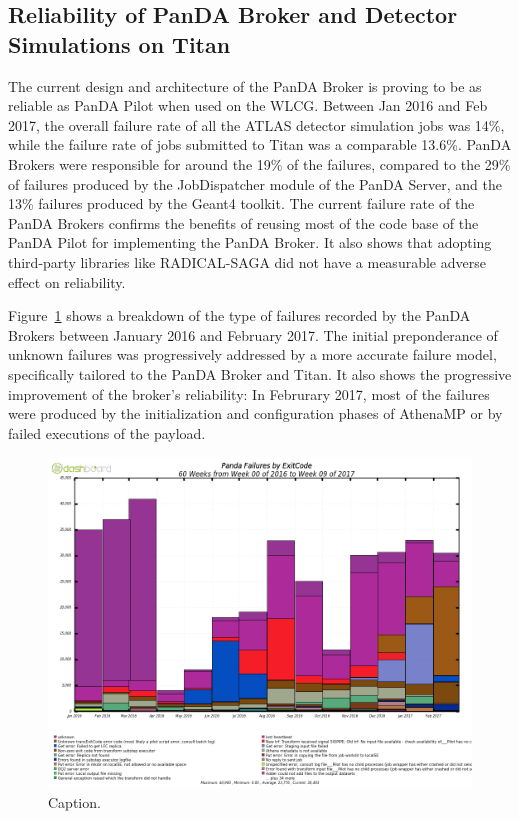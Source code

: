 \subsection{Reliability of PanDA Broker and Detector Simulations on Titan}
\label{ssec:reliability}

The current design and architecture of the PanDA Broker is proving to be as
reliable as PanDA Pilot when used on the WLCG. Between Jan 2016 and Feb 2017,
the overall failure rate of all the ATLAS detector simulation jobs was 14\%,
while the failure rate of jobs submitted to Titan was a comparable 13.6\%. PanDA
Brokers were responsible for around the 19\% of the failures, compared to the
29\% of failures produced by the JobDispatcher module of the PanDA Server, and
the 13\% failures produced by the Geant4 toolkit. The current failure rate of
the PanDA Brokers confirms the benefits of reusing most of the code base of the
PanDA Pilot for implementing the PanDA Broker. It also shows that adopting
third-party libraries like RADICAL-SAGA did not have a measurable adverse effect
on reliability.

Figure~\ref{fig:failures-titan} shows a breakdown of the type of failures
recorded by the PanDA Brokers between January 2016 and February 2017. The
initial preponderance of unknown failures was progressively addressed by a more
accurate failure model, specifically tailored to the PanDA Broker and Titan. It
also shows the progressive improvement of the broker's reliability: In Februrary
2017, most of the failures were produced by the initialization and configuration
phases of AthenaMP or by failed executions of the payload.

\begin{figure}[htp]
    \includegraphics[clip,width=\columnwidth]{figures/failures_titan.png}
\caption{Caption.}
\label{fig:failures-titan}
\end{figure}


